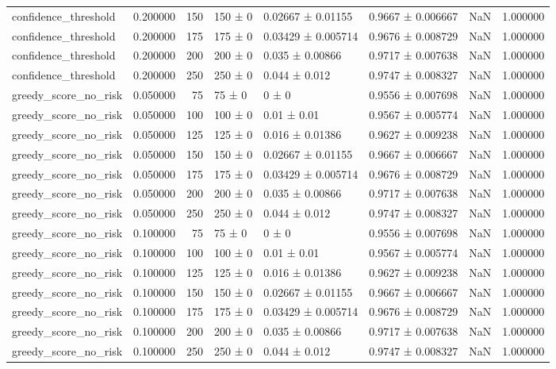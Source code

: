 \begin{tabular}{lrrllllr}
confidence_threshold & 0.200000 & 150 & 150 ± 0 & 0.02667 ± 0.01155 & 0.9667 ± 0.006667 & NaN & 1.000000 \\
confidence_threshold & 0.200000 & 175 & 175 ± 0 & 0.03429 ± 0.005714 & 0.9676 ± 0.008729 & NaN & 1.000000 \\
confidence_threshold & 0.200000 & 200 & 200 ± 0 & 0.035 ± 0.00866 & 0.9717 ± 0.007638 & NaN & 1.000000 \\
confidence_threshold & 0.200000 & 250 & 250 ± 0 & 0.044 ± 0.012 & 0.9747 ± 0.008327 & NaN & 1.000000 \\
greedy_score_no_risk & 0.050000 & 75 & 75 ± 0 & 0 ± 0 & 0.9556 ± 0.007698 & NaN & 1.000000 \\
greedy_score_no_risk & 0.050000 & 100 & 100 ± 0 & 0.01 ± 0.01 & 0.9567 ± 0.005774 & NaN & 1.000000 \\
greedy_score_no_risk & 0.050000 & 125 & 125 ± 0 & 0.016 ± 0.01386 & 0.9627 ± 0.009238 & NaN & 1.000000 \\
greedy_score_no_risk & 0.050000 & 150 & 150 ± 0 & 0.02667 ± 0.01155 & 0.9667 ± 0.006667 & NaN & 1.000000 \\
greedy_score_no_risk & 0.050000 & 175 & 175 ± 0 & 0.03429 ± 0.005714 & 0.9676 ± 0.008729 & NaN & 1.000000 \\
greedy_score_no_risk & 0.050000 & 200 & 200 ± 0 & 0.035 ± 0.00866 & 0.9717 ± 0.007638 & NaN & 1.000000 \\
greedy_score_no_risk & 0.050000 & 250 & 250 ± 0 & 0.044 ± 0.012 & 0.9747 ± 0.008327 & NaN & 1.000000 \\
greedy_score_no_risk & 0.100000 & 75 & 75 ± 0 & 0 ± 0 & 0.9556 ± 0.007698 & NaN & 1.000000 \\
greedy_score_no_risk & 0.100000 & 100 & 100 ± 0 & 0.01 ± 0.01 & 0.9567 ± 0.005774 & NaN & 1.000000 \\
greedy_score_no_risk & 0.100000 & 125 & 125 ± 0 & 0.016 ± 0.01386 & 0.9627 ± 0.009238 & NaN & 1.000000 \\
greedy_score_no_risk & 0.100000 & 150 & 150 ± 0 & 0.02667 ± 0.01155 & 0.9667 ± 0.006667 & NaN & 1.000000 \\
greedy_score_no_risk & 0.100000 & 175 & 175 ± 0 & 0.03429 ± 0.005714 & 0.9676 ± 0.008729 & NaN & 1.000000 \\
greedy_score_no_risk & 0.100000 & 200 & 200 ± 0 & 0.035 ± 0.00866 & 0.9717 ± 0.007638 & NaN & 1.000000 \\
greedy_score_no_risk & 0.100000 & 250 & 250 ± 0 & 0.044 ± 0.012 & 0.9747 ± 0.008327 & NaN & 1.000000 \\

\end{tabular}
